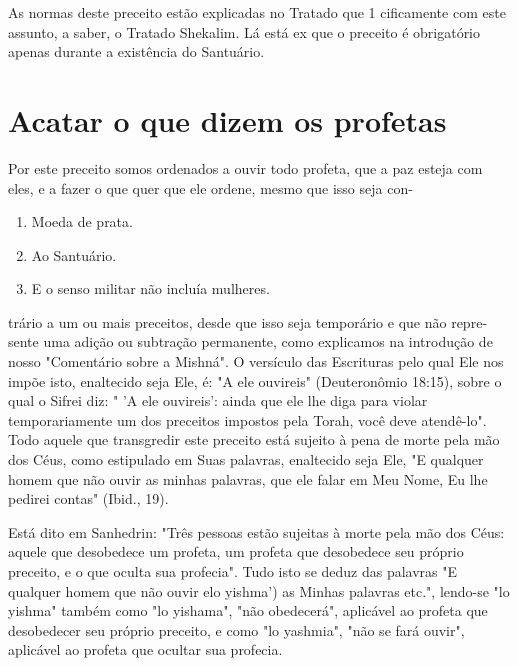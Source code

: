 \begin{itemize}
\begin{enumrate}
\begin{itemize}
\begin{itemize}
\begin{itemize}
As normas deste preceito estão explicadas no Tratado que 1 cificamente
com este assunto, a saber, o Tratado Shekalim. Lá está ex que o preceito
é obrigatório apenas durante a existência do Santuário.


\section{Acatar o que dizem os profetas}


Por este preceito somos ordenados a ouvir todo profeta, que a paz esteja
com eles, e a fazer o que quer que ele ordene, mesmo que isso seja con-


\begin{enumerate}
\def\labelenumi{\arabic{enumi}.}
\setcounter{enumi}{185}
\item
 
 Moeda de prata.
 
\item
 
 Ao Santuário.
 
\item
 
 E o senso militar não incluía mulheres.
 
\end{enumerate}

trário a um ou mais preceitos, desde que isso seja temporário e que não
repre­sente uma adição ou subtração permanente, como explicamos na
introdução de nosso "Comentário sobre a Mishná". O versículo das
Escrituras pelo qual Ele nos impõe isto, enaltecido seja Ele, é: "A ele
ouvireis" (Deuteronômio 18:15), sobre o qual o Sifrei diz: " 'A ele
ouvireis': ainda que ele lhe diga para violar temporariamente um dos
preceitos impostos pela Torah, você deve atendê-lo". Todo aquele que
transgredir este preceito está sujeito à pena de morte pela mão dos
Céus, como estipulado em Suas palavras, enaltecido seja Ele, "E qualquer
homem que não ouvir as minhas palavras, que ele falar em Meu Nome, Eu
lhe pedirei contas" (Ibid., 19).

Está dito em Sanhedrin: "Três pessoas estão sujeitas à morte pela mão
dos Céus: aquele que desobedece um profeta, um profeta que desobedece
seu próprio preceito, e o que oculta sua profecia". Tudo isto se deduz
das palavras "E qualquer homem que não ouvir elo yishma') as Minhas
palavras etc.", lendo-se "lo yishma" também como "lo yishama", "não
obedecerá", aplicável ao pro­feta que desobedecer seu próprio preceito,
e como "lo yashmia", "não se fará ouvir", aplicável ao profeta que
ocultar sua profecia.



\end{itemize}
\end{itemize}
\end{itemize}
\end{enumrate}
\end{itemize}
